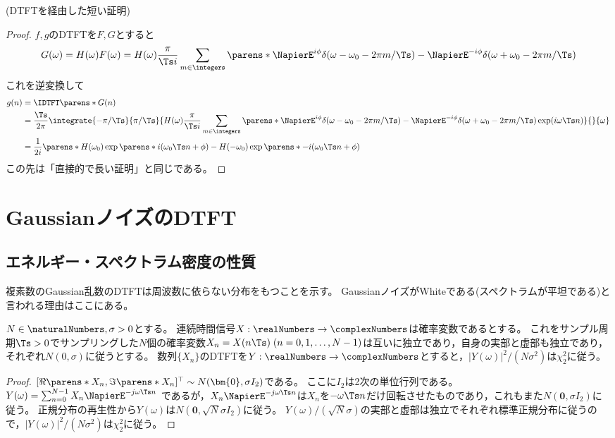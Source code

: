         (DTFTを経由した短い証明)
        \begin{proof}
            $f,g$のDTFTを$F,G$とすると
            \[ G(\omega) = H(\omega)F(\omega) = H(\omega)\frac{\pi}{\Ts i}\sum_{m\in\integers}\parens*{\NapierE^{i\phi}\delta(\omega-\omega_0 - 2\pi m/\Ts) - \NapierE^{-i\phi}\delta(\omega+\omega_0 - 2\pi m/\Ts)} \]
            これを逆変換して
            \begin{align*}
                g(n) &= \IDTFT\parens*{G}(n) \\
                &= \frac{\Ts}{2\pi}\integrate{-\pi/\Ts}{\pi/\Ts}{H(\omega)\frac{\pi}{\Ts i}\sum_{m\in\integers}\parens*{\NapierE^{i\phi}\delta(\omega-\omega_0 - 2\pi m/\Ts) - \NapierE^{-i\phi}\delta(\omega+\omega_0 - 2\pi m/\Ts)}\exp(i\omega\Ts n)}{}{\omega} \\
                &= \frac{1}{2i}\parens*{H(\omega_0)\exp\parens*{i(\omega_0\Ts n+\phi)} - H(-\omega_0)\exp\parens*{-i(\omega_0\Ts n+\phi)}}
            \end{align*}
            この先は「直接的で長い証明」と同じである。
        \end{proof}
    \section{GaussianノイズのDTFT}
        \subsection{エネルギー・スペクトラム密度の性質}
            \label{GaussianノイズのDTFTのエネルギー・スペクトラム密度}
            複素数のGaussian乱数のDTFTは周波数に依らない分布をもつことを示す。
            GaussianノイズがWhiteである(スペクトラムが平坦である)と言われる理由はここにある。
            \begin{shadebox}
                $N\in\naturalNumbers,\sigma>0$とする。
                連続時間信号$X:\realNumbers\to\complexNumbers$は確率変数であるとする。
                これをサンプル周期$\Ts>0$でサンプリングした$N$個の確率変数$X_n = X(n\Ts)\;(n=0,1,\dots,N-1)$は互いに独立であり，自身の実部と虚部も独立であり，それぞれ$N(0,\sigma)$に従うとする。
                数列$\{X_n\}$のDTFTを$Y:\realNumbers\to\complexNumbers$とすると，$|Y(\omega)|^2/(N\sigma^2)$は$\chi_2^2$に従う。
            \end{shadebox}
            \begin{proof}
                $[\Re\parens*{X_n}, \Im\parens*{X_n}]^\top \sim N(\bm{0}, \sigma I_2)$である。
                ここに$I_2$は2次の単位行列である。
                $Y(\omega) = \sum_{n=0}^{N-1} X_n \NapierE^{-j\omega\Ts n}$
                であるが，$X_n \NapierE^{-j\omega\Ts n}$は$X_n$を$-\omega\Ts n$だけ回転させたものであり，これもまた$N(\bm{0}, \sigma I_2)$に従う。
                正規分布の再生性から$Y(\omega)$は$N(\bm{0}, \sqrt{N}\sigma I_2)$に従う。
                $Y(\omega)/(\sqrt{N}\sigma)$の実部と虚部は独立でそれぞれ標準正規分布に従うので，$|Y(\omega)|^2/(N\sigma^2)$は$\chi_2^2$に従う。
            \end{proof}
